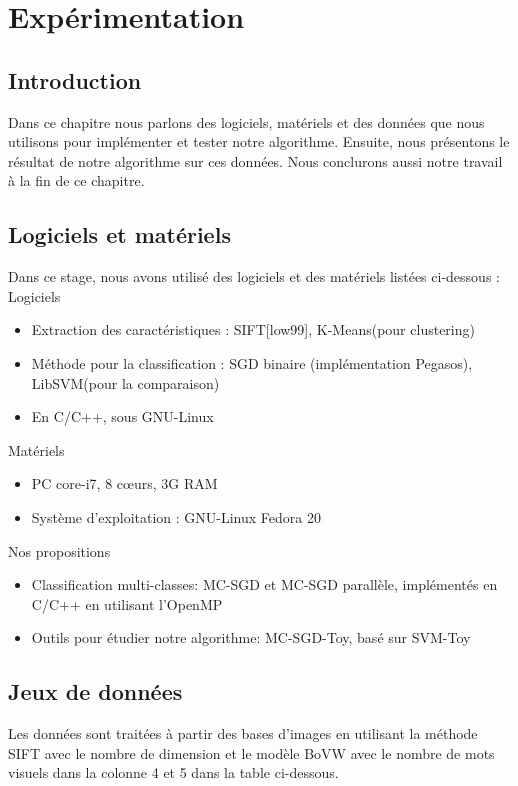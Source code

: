 \chapter{Expérimentation}
\label{chap:exp}

\section{Introduction}
Dans ce chapitre nous parlons des logiciels, matériels et des données que nous utilisons pour implémenter et tester notre algorithme. Ensuite, nous présentons le résultat de notre algorithme sur ces données. Nous conclurons aussi notre travail à la fin de ce chapitre.

\section{Logiciels et matériels}
Dans ce stage, nous avons utilisé des logiciels et des matériels listées ci-dessous :\\
Logiciels
\begin{itemize}
\item Extraction des caractéristiques : SIFT[low99], K-Means(pour clustering)
\item Méthode pour la classification : SGD binaire (implémentation Pegasos), LibSVM(pour la comparaison)
\item En C/C++, sous GNU-Linux
\end{itemize}
Matériels
\begin{itemize}
\item PC core-i7, 8 cœurs, 3G RAM
\item Système d'exploitation : GNU-Linux Fedora 20
\end{itemize}
Nos propositions
\begin{itemize}
\item Classification multi-classes: MC-SGD et MC-SGD parallèle, implémentés en C/C++ en utilisant l'OpenMP
\item Outils pour étudier notre algorithme: MC-SGD-Toy, basé sur SVM-Toy\cite{cl01}
\end{itemize}

\section{Jeux de données}
Les données sont traitées à partir des bases d'images en utilisant la méthode SIFT avec le nombre de dimension et le modèle BoVW avec le nombre de mots visuels dans la colonne 4 et 5 dans la table ci-dessous.

